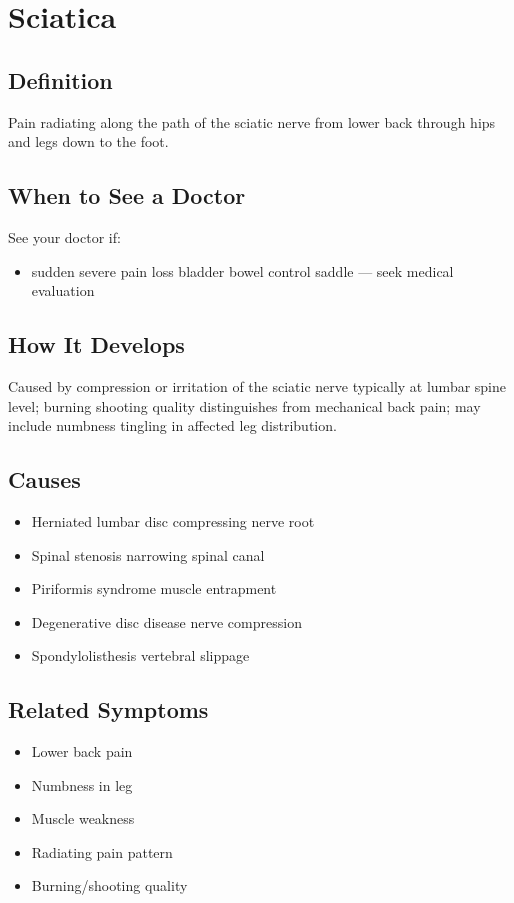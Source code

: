 \chapter{Sciatica}

\section*{Definition}
Pain radiating along the path of the sciatic nerve from lower back through hips and legs down to the foot.

\section*{When to See a Doctor}
See your doctor if:
\begin{itemize}
  \item sudden severe pain loss bladder bowel control saddle — seek medical evaluation
\end{itemize}

\section*{How It Develops}
Caused by compression or irritation of the sciatic nerve typically at lumbar spine level; burning shooting quality distinguishes from mechanical back pain; may include numbness tingling in affected leg distribution.

\section*{Causes}
\begin{itemize}
  \item Herniated lumbar disc compressing nerve root
  \item Spinal stenosis narrowing spinal canal
  \item Piriformis syndrome muscle entrapment
  \item Degenerative disc disease nerve compression
  \item Spondylolisthesis vertebral slippage
\end{itemize}

\section*{Related Symptoms}
\begin{itemize}
  \item Lower back pain
  \item Numbness in leg
  \item Muscle weakness
  \item Radiating pain pattern
  \item Burning/shooting quality
\end{itemize}


